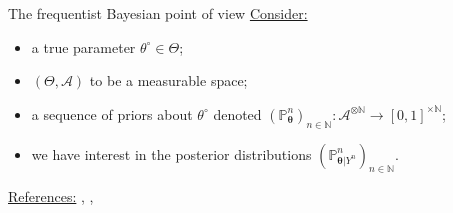 \documentclass[10pt]{beamer}
\begin{document}
\begin{frame}{The frequentist Bayesian point of view}
%
\underline{Consider:}
\begin{itemize}
\setlength\itemsep{2em}
\item a true parameter $\theta^{\circ} \in \Theta$;
\item $\left(\Theta, \mathcal{A}\right)$ to be a measurable space;
\item a sequence of priors about $\theta^{\circ}$ denoted $\left(\mathbb{P}_{\boldsymbol{\theta}}^{n}\right)_{n \in \mathbb{N}}: \mathcal{A}^{\otimes \mathbb{N}} \rightarrow [0,1]^{\times\mathbb{N}}$;
\item we have interest in the posterior distributions $\left(\mathbb{P}_{\boldsymbol{\theta}\vert Y^{n}}^{n}\right)_{n \in \mathbb{N}}$.
\end{itemize}

\bigskip
\bigskip

\underline{References:} \textsc{\citet{Schwartz1965}}, \textsc{\citet{Schwartz01071964}}, \textsc{\citet{ghosal2000convergence}}
\end{frame}
\end{document}
